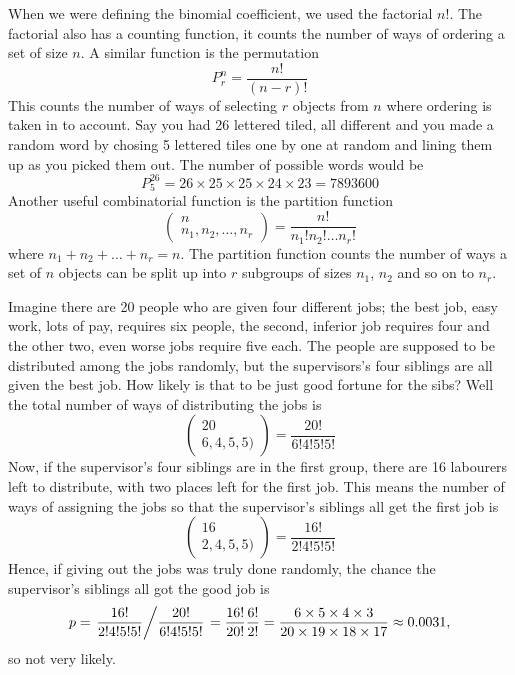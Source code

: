 \documentclass[11pt,a4paper]{scrartcl}
\begin{document}
When we were defining the binomial coefficient, we used the factorial
$n!$. The factorial also has a counting function, it counts the number
of ways of ordering a set of size $n$. A similar function is the permutation
\begin{equation}
P^n_r=\frac{n!}{(n-r)!}
\end{equation}
This counts the number of ways of selecting $r$ objects from $n$ where
ordering is taken in to account. Say you had 26 lettered tiled, all
different and you made a random word by chosing 5 lettered tiles one by one at
random and lining them up as you picked them out. The number of possible words would be
\begin{equation}
P^{26}_5=26\times 25\times 25\times 24\times 23=7893600
\end{equation}
Another useful combinatorial function is the partition function
\begin{equation}
\left(\begin{array}{c} n\\n_1,n_2,\ldots,n_r\end{array}\right)=\frac{n!}{n_1!n_2!\ldots n_r!}
\end{equation}
where $n_1+n_2+\ldots+n_r=n$. The partition function counts the number
of ways a set of $n$ objects can be split up into $r$ subgroups of
sizes $n_1$, $n_2$ and so on to $n_r$.

Imagine there are 20 people who are given four different jobs; the best
job, easy work, lots of pay, requires six people, the second,
inferior job requires four and the other two, even worse jobs require
five each. The people are supposed to be distributed among the jobs
randomly, but the supervisors's four siblings are all given the best
job. How likely is that to be just good fortune for the sibs? Well the
total number of ways of distributing the jobs is
\begin{equation}
\left(\begin{array}{c} 20\\6,4,5,5)\end{array}\right)=\frac{20!}{6!4!5!5!}
\end{equation}
Now, if the supervisor's four siblings are in the first group, there
are 16 labourers left to distribute, with two places left for the first job. This means the number of ways of assigning the jobs so that the supervisor's siblings all get the first job is
\begin{equation}
\left(\begin{array}{c} 16\\2,4,5,5)\end{array}\right)=\frac{16!}{2!4!5!5!}
\end{equation}
Hence, if giving out the jobs was truly done randomly, the chance the supervisor's siblings all got the good job is
\begin{equation}
p=\left.\frac{16!}{2!4!5!5!}\middle/\frac{20!}{6!4!5!5!}\right.=\frac{16!}{20!}\frac{6!}{2!}
=\frac{6\times 5\times 4\times 3}{20\times 19\times 18\times 17}
\approx 0.0031,
\end{equation}
so not very likely.
\end{document}
